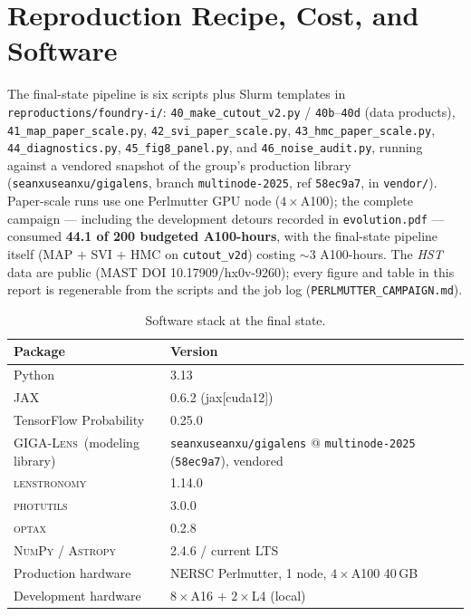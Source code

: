 \documentclass[11pt,letterpaper]{article}
\newcommand{\gigalens}{\textsc{GIGA-Lens}}
\newcommand{\lenstronomy}{\textsc{lenstronomy}}
\newcommand{\photutils}{\textsc{photutils}}
\begin{document}
\section{Reproduction Recipe, Cost, and Software}
\label{sec:recipe}

The final-state pipeline is six scripts plus Slurm templates in
\texttt{reproductions/foundry-i/}:
\texttt{40\_make\_cutout\_v2.py} / \texttt{40b}--\texttt{40d} (data
products), \texttt{41\_map\_paper\_scale.py},
\texttt{42\_svi\_paper\_scale.py}, \texttt{43\_hmc\_paper\_scale.py},
\texttt{44\_diagnostics.py}, \texttt{45\_fig8\_panel.py}, and
\texttt{46\_noise\_audit.py}, running against a vendored snapshot of
the group's production library (\texttt{seanxuseanxu/gigalens},
branch \texttt{multinode-2025}, ref \texttt{58ec9a7}, in
\texttt{vendor/}). Paper-scale runs use one Perlmutter GPU node
($4\times$A100); the complete campaign --- including the development
detours recorded in \texttt{evolution.pdf} --- consumed
{\bf 44.1 of 200 budgeted A100-hours}, with the final-state pipeline
itself (MAP $+$ SVI $+$ HMC on \texttt{cutout\_v2d}) costing
$\sim$$3$ A100-hours. The {\it HST} data are public (MAST DOI
10.17909/hx0v-9260); every figure and table in this report is
regenerable from the scripts and the job log
(\texttt{PERLMUTTER\_CAMPAIGN.md}).

\begin{table}[ht]
\centering
\caption{Software stack at the final state.}
\label{tab:software}
\begin{tabular}{ll}
\toprule
Package & Version \\
\midrule
Python                          & 3.13 \\
JAX                             & 0.6.2 (jax[cuda12]) \\
TensorFlow Probability          & 0.25.0 \\
\gigalens\ (modeling library)   & \texttt{seanxuseanxu/gigalens} @ \texttt{multinode-2025} (\texttt{58ec9a7}), vendored \\
\lenstronomy                    & 1.14.0 \\
\photutils                      & 3.0.0 \\
\textsc{optax}                  & 0.2.8 \\
\textsc{NumPy} / \textsc{Astropy} & 2.4.6 / current LTS \\
Production hardware             & NERSC Perlmutter, 1 node, $4\times$A100 40\,GB \\
Development hardware            & $8\times$A16 $+$ $2\times$L4 (local) \\
\bottomrule
\end{tabular}
\end{table}
\end{document}
